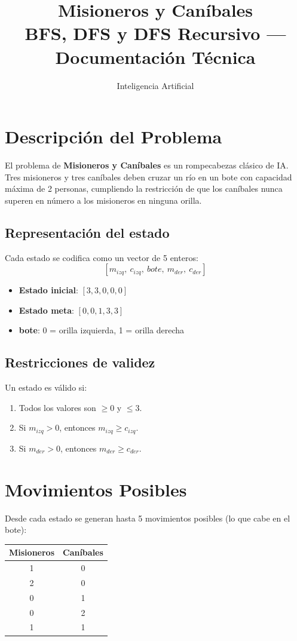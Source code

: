 \documentclass[12pt,a4paper]{article}
\title{\textbf{Misioneros y Caníbales}\\
  \large BFS, DFS y DFS Recursivo --- Documentación Técnica}
\author{Inteligencia Artificial}
\date{}
\begin{document}
\maketitle
\tableofcontents
\newpage

\section{Descripción del Problema}
El problema de \textbf{Misioneros y Caníbales} es un rompecabezas clásico de IA. Tres misioneros y tres caníbales deben cruzar un río en un bote con capacidad máxima de 2 personas, cumpliendo la restricción de que los caníbales nunca superen en número a los misioneros en ninguna orilla.

\subsection{Representación del estado}
Cada estado se codifica como un vector de 5 enteros:
\[ [m_{izq},\ c_{izq},\ bote,\ m_{der},\ c_{der}] \]

\begin{itemize}
  \item \textbf{Estado inicial}: $[3, 3, 0, 0, 0]$
  \item \textbf{Estado meta}: $[0, 0, 1, 3, 3]$
  \item \textbf{bote}: 0 = orilla izquierda, 1 = orilla derecha
\end{itemize}

\subsection{Restricciones de validez}
Un estado es válido si:
\begin{enumerate}
  \item Todos los valores son $\geq 0$ y $\leq 3$.
  \item Si $m_{izq} > 0$, entonces $m_{izq} \geq c_{izq}$.
  \item Si $m_{der} > 0$, entonces $m_{der} \geq c_{der}$.
\end{enumerate}

\section{Movimientos Posibles}
Desde cada estado se generan hasta 5 movimientos posibles (lo que cabe en el bote):
\begin{center}
\begin{tabular}{|c|c|}
\hline
\textbf{Misioneros} & \textbf{Caníbales} \\
\hline
1 & 0 \\
2 & 0 \\
0 & 1 \\
0 & 2 \\
1 & 1 \\
\hline
\end{tabular}
\end{center}
\end{document}
